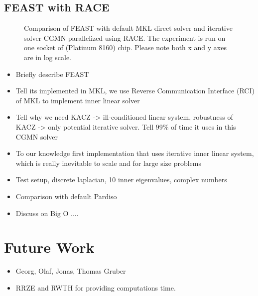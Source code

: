 \subsection{FEAST with RACE}
\lipsum
\begin{figure}[tb]
	\centering
	\scalebox{0.56}{}
	\caption{Comparison of FEAST with default \acrshort{MKL} direct solver and 
		iterative solver CGMN parallelized using \acrshort{RACE}. The experiment is
		run on one socket of \SKX (Platinum 8160) chip. Please note both x and y axes
		are in log scale.}
\end{figure}

\begin{itemize}
	\item Briefly describe FEAST
	\item Tell its implemented in MKL, we use Reverse Communication Interface (RCI) of
		\acrshort{MKL} to implement inner linear solver
	\item Tell why we need KACZ -> ill-conditioned linear system, robustness of KACZ -> only potential iterative solver. Tell 99\% of time it uses in this CGMN solver
	\item To our knowledge first implementation that uses iterative inner linear system, which is really inevitable to scale and for large size problems
	\item  Test setup, discrete laplacian, 10 inner eigenvalues, complex numbers 
	\item Comparison with default Pardiso
	\item Discuss on Big O ....
\end{itemize}


\section{Future Work}

\begin{acks}
\begin{itemize}
	\item Georg, Olaf, Jonas, Thomas Gruber
	\item RRZE and RWTH for providing computations time.
\end{itemize}
\end{acks}


